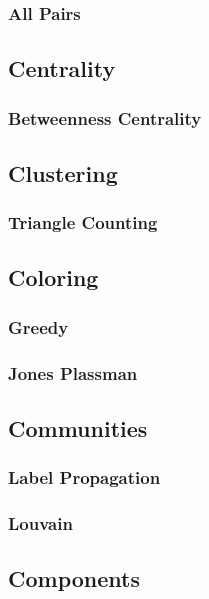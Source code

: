 \subsubsection{All Pairs}

\subsection{Centrality}
\subsubsection{Betweenness Centrality}

\subsection{Clustering}
\subsubsection{Triangle Counting}

\subsection{Coloring}
\subsubsection{Greedy}
\subsubsection{Jones Plassman}

\subsection{Communities}
\subsubsection{Label Propagation}
\subsubsection{Louvain}

\subsection{Components}
